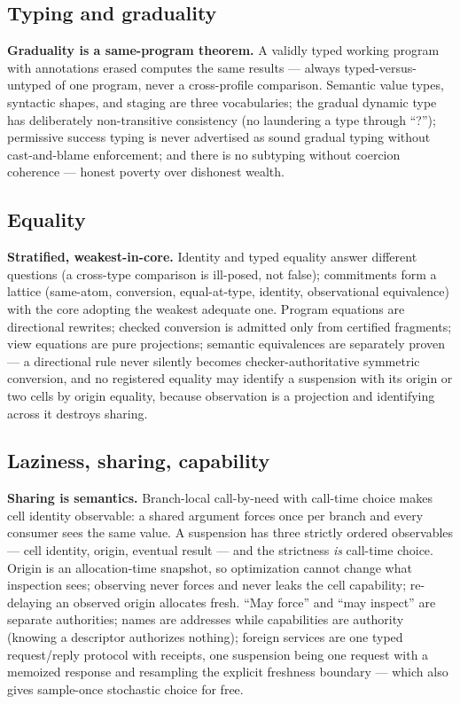 \documentclass[11pt]{article}
\begin{document}
\subsection{Typing and graduality}
\textbf{Graduality is a same-program theorem.}  A validly typed working
program with annotations erased computes the same results --- always
typed-versus-untyped of one program, never a cross-profile comparison.
Semantic value types, syntactic shapes, and staging are three
vocabularies; the gradual dynamic type has deliberately non-transitive
consistency (no laundering a type through ``?''); permissive success
typing is never advertised as sound gradual typing without cast-and-blame
enforcement; and there is no subtyping without coercion coherence ---
honest poverty over dishonest wealth.

\subsection{Equality}
\textbf{Stratified, weakest-in-core.}  Identity and typed equality answer
different questions (a cross-type comparison is ill-posed, not false);
commitments form a lattice (same-atom, conversion, equal-at-type,
identity, observational equivalence) with the core adopting the weakest
adequate one.  Program equations are directional rewrites; checked
conversion is admitted only from certified fragments; view equations are
pure projections; semantic equivalences are separately proven --- a
directional rule never silently becomes checker-authoritative symmetric
conversion, and no registered equality may identify a suspension with its
origin or two cells by origin equality, because observation is a
projection and identifying across it destroys sharing.

\subsection{Laziness, sharing, capability}
\textbf{Sharing is semantics.}  Branch-local call-by-need with call-time
choice makes cell identity observable: a shared argument forces once per
branch and every consumer sees the same value.  A suspension has three
strictly ordered observables --- cell identity, origin, eventual result
--- and the strictness \emph{is} call-time choice.  Origin is an
allocation-time snapshot, so optimization cannot change what inspection
sees; observing never forces and never leaks the cell capability;
re-delaying an observed origin allocates fresh.  ``May force'' and ``may
inspect'' are separate authorities; names are addresses while
capabilities are authority (knowing a descriptor authorizes nothing);
foreign services are one typed request/reply protocol with receipts, one
suspension being one request with a memoized response and resampling the
explicit freshness boundary --- which also gives sample-once stochastic
choice for free.
\end{document}
